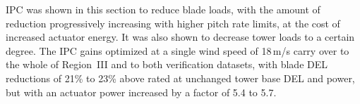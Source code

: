 IPC was shown in this section to reduce blade loads, with the amount of reduction progressively increasing with higher pitch rate limits, at the cost of increased actuator energy. It was also shown to decrease tower loads to a certain degree. The IPC gains optimized at a single wind speed of 18\,m/s carry over to the whole of Region~III and to both verification datasets, with blade DEL reductions of 21\% to 23\% above rated at unchanged tower base DEL and power, but with an actuator power increased by a factor of 5.4 to 5.7. 

